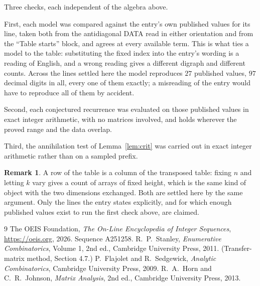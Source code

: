 \documentclass[11pt,a4paper]{article}
\theoremstyle{plain}
\theoremstyle{definition}
\newtheorem{remark}[theorem]{Remark}
\begin{document}
Three checks, each independent of the algebra above.

First, each model was compared against the entry's own published values for its line, taken
both from the antidiagonal DATA read in either orientation and from the ``Table starts''
block, and agrees at every available term. This is what ties a model to the table:
substituting the fixed index into the entry's wording is a reading of English, and a wrong
reading gives a different digraph and different counts. Across the lines settled here the
model reproduces $27$ published values, $97$ decimal digits in all, every one of
them exactly; a misreading of the entry would have to reproduce all of them by accident.

Second, each conjectured recurrence was evaluated on those published values in exact
integer arithmetic, with no matrices involved, and holds wherever the proved range and the
data overlap.

Third, the annihilation test of Lemma~\ref{lem:crit} was carried out in exact integer
arithmetic rather than on a sampled prefix.

\begin{remark}
A row of the table is a column of the transposed table: fixing $n$ and letting $k$ vary gives a
count of arrays of fixed height, which is the same kind of object with the two dimensions
exchanged. Both are settled here by the same argument. Only the lines the entry states
explicitly, and for which enough published values exist to run the first check above, are
claimed.
\end{remark}

\begin{thebibliography}{9}
 The OEIS Foundation, \emph{The On-Line Encyclopedia of Integer
Sequences}, \url{https://oeis.org}, 2026. Sequence A251258.
 R.~P.~Stanley, \emph{Enumerative Combinatorics}, Volume 1, 2nd ed.,
Cambridge University Press, 2011. (Transfer-matrix method, Section 4.7.)
 P.~Flajolet and R.~Sedgewick, \emph{Analytic Combinatorics}, Cambridge
University Press, 2009.
 R.~A.~Horn and C.~R.~Johnson, \emph{Matrix Analysis}, 2nd ed., Cambridge
University Press, 2013.
\end{thebibliography}
\end{document}
